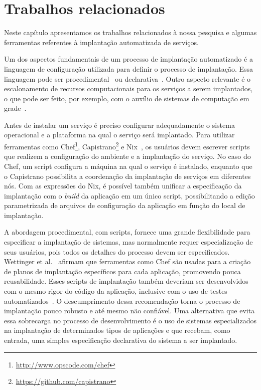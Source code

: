 
\chapter{Trabalhos relacionados}
\label{cap:relacionados}

Neste capítulo apresentamos os trabalhos relacionados à nossa pesquisa e algumas ferramentas 
referentes à implantação automatizada de serviços. 

Um dos aspectos fundamentais de um processo de implantação automatizado é a linguagem de configuração utilizada para definir o processo de implantação. Essa linguagem pode ser procedimental~\cite{Dolstra2005Configuration} ou declarativa~\cite{Magee1996Dynamic, Balter1998Olan}. Outro aspecto relevante é o escalonamento de recursos computacionais para os serviços a serem implantados, o que pode ser feito, por exemplo, com o auxílio de sistemas de computação em grade~\cite{Watson2006Dynasoar}.

Antes de instalar um serviço é preciso configurar adequadamente o sistema operacional e a plataforma na qual o serviço será implantado. Para utilizar ferramentas como Chef\footnote{\url{http://www.opscode.com/chef}}, Capistrano\footnote{\url{https://github.com/capistrano}} e Nix~\cite{Dolstra2005Configuration}, os usuários devem escrever scripts que realizem a configuração do ambiente e a implantação do serviço. No caso do Chef, um script configura a máquina na qual o serviço é instalado, enquanto que o Capistrano possibilita a coordenação da implantação de serviços em diferentes nós. Com as expressões do Nix, é possível também unificar a especificação da implantação com o \textit{build} da aplicação em um único script, possibilitando a edição parametrizada de arquivos de configuração da aplicação em função do local de implantação. 

A abordagem procedimental, com scripts, fornece uma grande 
flexibilidade para especificar a implantação de sistemas, 
mas normalmente requer especialização de seus usuários, 
pois todos os detalhes do processo devem ser especificados. 
Wettinger et al.~\cite{Wettinger2013ExtensiblePaaS} 
afirmam que ferramentas como Chef são usadas
para a criação de planos de implantação específicos para cada aplicação,
promovendo pouca reusabilidade.
Esses scripts de implantação também deveriam ser desenvolvidos 
com o mesmo rigor do código da aplicação, inclusive com o uso 
de testes automatizados~\cite{Humble2011Continuous}. 
O descumprimento dessa recomendação torna o processo de implantação 
pouco robusto e até mesmo não confiável. Uma alternativa que evita 
essa sobrecarga no processo de desenvolvimento é o uso de sistemas 
especializados na implantação de determinados tipos de aplicações e que recebam, 
como entrada, uma simples especificação declarativa do sistema a ser implantado.


